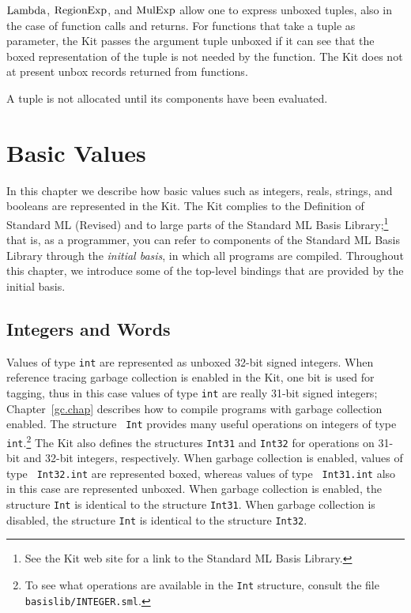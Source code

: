 \documentclass[12pt]{book}
\begin{document}
$\hbox{\rm Lambda}$, $\hbox{\rm RegionExp}$, and $\hbox{\rm MulExp}$ allow one to express unboxed tuples,
also in the case of function calls and returns. For functions that
take a tuple as parameter, the Kit passes the argument tuple unboxed
%
%
if it can see that the boxed representation of the tuple is not needed
by the function. The Kit does not at present unbox records returned
from functions.

A tuple is not allocated until its components have been evaluated.

\chapter{Basic Values}
In this chapter we describe how basic values such as integers, reals,
strings, and booleans are represented in the Kit. The Kit complies to
the Definition of Standard ML (Revised)
%
and to large parts of the Standard ML Basis
Library;\footnote{See the Kit web site for a link to the Standard ML
  Basis Library.}
%
that is, as a programmer, you can refer to components of the Standard
ML Basis Library through the
%
{\em initial basis}, in which all programs are compiled.  Throughout
this chapter, we introduce some of the top-level bindings that are
provided by the initial basis.

\section{Integers and Words}
\label{integers.sec}
Values of type 
%
{\tt int} are represented as unboxed 32-bit signed integers. When
reference tracing garbage collection is enabled in the Kit, one bit is
used for tagging, thus in this case values of type {\tt int} are
really 31-bit signed integers; Chapter~\ref{gc.chap} describes how to
compile programs with garbage collection enabled. The structure {\tt
  Int} provides many useful operations on integers of type {\tt
  int}.\footnote{To see what operations are available in the {\tt Int}
  structure, consult the file {\tt basislib/INTEGER.sml}.}  The Kit
also defines the structures 
%
{\tt Int31} and 
%
{\tt Int32} for operations on 31-bit and 32-bit integers,
respectively. When garbage collection is enabled, values of type {\tt
  Int32.int} are represented boxed, whereas values of type {\tt
  Int31.int} also in this case are represented unboxed. When garbage
collection is enabled, the structure {\tt Int} is identical to the
structure {\tt Int31}. When garbage collection is disabled, the
structure {\tt Int} is identical to the structure {\tt Int32}.
\end{document}
